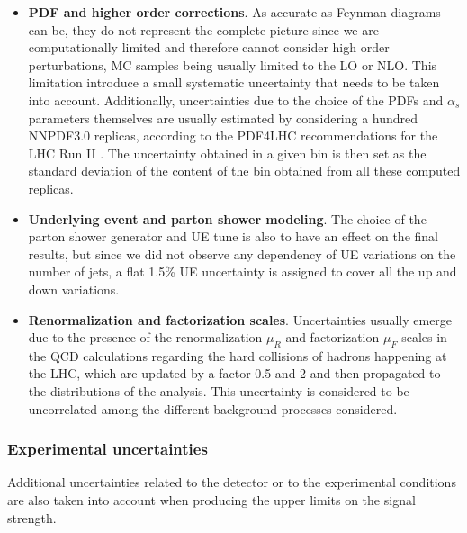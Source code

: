 \documentclass[a4paper, 10pt, openright]{report}
\begin{document}
\begin{itemize}
\item \textbf{PDF and higher order corrections}. As accurate as Feynman diagrams can be, they do not represent the complete picture since we are computationally limited and therefore cannot consider high order perturbations, \ac{MC} samples being usually limited to the \acf{LO} or \acf{NLO}. This limitation introduce a small systematic uncertainty that needs to be taken into account. Additionally, uncertainties due to the choice of the \acp{PDF} and $\alpha_s$ parameters themselves are usually estimated by considering a hundred NNPDF3.0 \cite{NNPDF} replicas, according to the PDF4LHC recommendations for the \ac{LHC} Run II \cite{PDF4LHC}. The uncertainty obtained in a given bin is then set as the standard deviation of the content of the bin obtained from all these computed replicas.
\item \textbf{Underlying event and parton shower modeling}. The choice of the parton shower generator and \ac{UE} tune is also to have an effect on the final results, but since we did not observe any dependency of \ac{UE} variations on the number of jets, a flat 1.5\% \ac{UE} uncertainty is assigned to cover all the up and down variations.
\item \textbf{Renormalization and factorization scales}. Uncertainties usually emerge due to the presence of the renormalization $\mu_R$ and factorization $\mu_F$ scales in the QCD calculations regarding the hard collisions of hadrons happening at the \ac{LHC}, which are updated by a factor 0.5 and 2 and then propagated to the distributions of the analysis. This uncertainty is considered to be uncorrelated among the different background processes considered.
\end{itemize}

\subsubsection{Experimental uncertainties}

Additional uncertainties related to the detector or to the experimental conditions are also taken into account when producing the upper limits on the signal strength.
\end{document}
